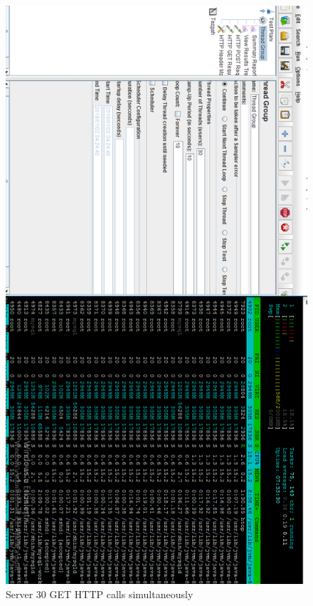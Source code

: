 \begin{figure}[!htbp]
\centering
\includegraphics[width=\textwidth]{projectChapters/images/30users.png}
\caption{Server 30 GET HTTP calls simultaneously}
\label{fig:30users}
\end{figure}

\newpage

